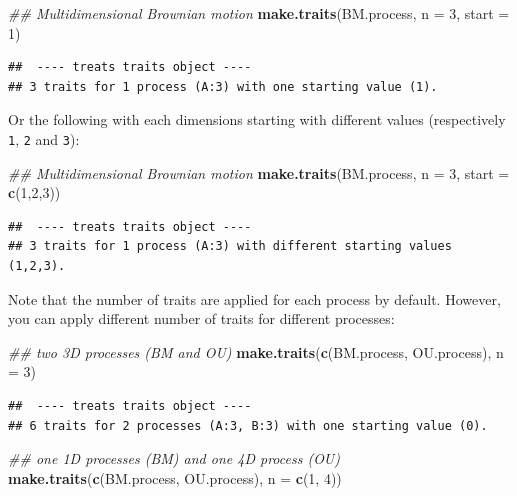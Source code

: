 \documentclass[
]{book}
\newenvironment{Shaded}{\begin{snugshade}}{\end{snugshade}}
\newcommand{\CommentTok}[1]{\textcolor[rgb]{0.56,0.35,0.01}{\textit{#1}}}
\newcommand{\DataTypeTok}[1]{\textcolor[rgb]{0.13,0.29,0.53}{#1}}
\newcommand{\DecValTok}[1]{\textcolor[rgb]{0.00,0.00,0.81}{#1}}
\newcommand{\KeywordTok}[1]{\textcolor[rgb]{0.13,0.29,0.53}{\textbf{#1}}}
\newcommand{\NormalTok}[1]{#1}
\begin{document}
\begin{Shaded}
\begin{Highlighting}[]
\CommentTok{\#\# Multidimensional Brownian motion}
\KeywordTok{make.traits}\NormalTok{(BM.process, }\DataTypeTok{n =} \DecValTok{3}\NormalTok{, }\DataTypeTok{start =} \DecValTok{1}\NormalTok{)}
\end{Highlighting}
\end{Shaded}

\begin{verbatim}
##  ---- treats traits object ---- 
## 3 traits for 1 process (A:3) with one starting value (1).
\end{verbatim}

Or the following with each dimensions starting with different values (respectively \texttt{1}, \texttt{2} and \texttt{3}):

\begin{Shaded}
\begin{Highlighting}[]
\CommentTok{\#\# Multidimensional Brownian motion}
\KeywordTok{make.traits}\NormalTok{(BM.process, }\DataTypeTok{n =} \DecValTok{3}\NormalTok{, }\DataTypeTok{start =} \KeywordTok{c}\NormalTok{(}\DecValTok{1}\NormalTok{,}\DecValTok{2}\NormalTok{,}\DecValTok{3}\NormalTok{))}
\end{Highlighting}
\end{Shaded}

\begin{verbatim}
##  ---- treats traits object ---- 
## 3 traits for 1 process (A:3) with different starting values (1,2,3).
\end{verbatim}

Note that the number of traits are applied for each process by default.
However, you can apply different number of traits for different processes:

\begin{Shaded}
\begin{Highlighting}[]
\CommentTok{\#\# two 3D processes (BM and OU)}
\KeywordTok{make.traits}\NormalTok{(}\KeywordTok{c}\NormalTok{(BM.process, OU.process), }\DataTypeTok{n =} \DecValTok{3}\NormalTok{)}
\end{Highlighting}
\end{Shaded}

\begin{verbatim}
##  ---- treats traits object ---- 
## 6 traits for 2 processes (A:3, B:3) with one starting value (0).
\end{verbatim}

\begin{Shaded}
\begin{Highlighting}[]
\CommentTok{\#\# one 1D processes (BM) and one 4D process (OU)}
\KeywordTok{make.traits}\NormalTok{(}\KeywordTok{c}\NormalTok{(BM.process, OU.process), }\DataTypeTok{n =} \KeywordTok{c}\NormalTok{(}\DecValTok{1}\NormalTok{, }\DecValTok{4}\NormalTok{))}
\end{Highlighting}
\end{Shaded}
\end{document}
